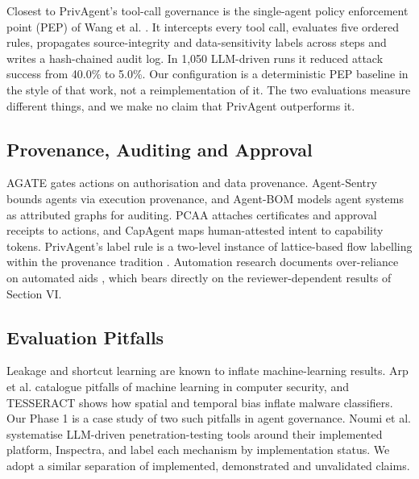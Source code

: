 \documentclass{ieeeaccess}
\begin{document}
Closest to PrivAgent's tool-call governance is the single-agent policy enforcement point (PEP) of Wang et al. \cite{wangpep}. It intercepts every tool call, evaluates five ordered rules, propagates source-integrity and data-sensitivity labels across steps and writes a hash-chained audit log. In 1,050 LLM-driven runs it reduced attack success from 40.0\% to 5.0\%. %
Our  configuration is a deterministic PEP baseline in the style of that work, not a reimplementation of it. %
The two evaluations measure different things, and we make no claim that PrivAgent outperforms it.

\subsection{Provenance, Auditing and Approval}

AGATE \cite{agate} gates actions on authorisation and data provenance. Agent-Sentry \cite{agentsentry} bounds agents via execution provenance, and Agent-BOM \cite{agentbom} models agent systems as attributed graphs for auditing. PCAA \cite{pcaa} attaches certificates and approval receipts to actions, and CapAgent \cite{capagent} maps human-attested intent to capability tokens. PrivAgent's label rule is a two-level instance of lattice-based flow labelling \cite{denning} within the provenance tradition \cite{buneman}. Automation research documents over-reliance on automated aids \cite{parasuraman}, which bears directly on the reviewer-dependent results of Section VI.

\subsection{Evaluation Pitfalls}

Leakage \cite{kapoor} and shortcut learning \cite{geirhos} are known to inflate machine-learning results. Arp et al. \cite{arp} catalogue pitfalls of machine learning in computer security, and TESSERACT \cite{tesseract} shows how spatial and temporal bias inflate malware classifiers. %
Our Phase 1 is a case study of two such pitfalls in agent governance. Noumi et al. \cite{noumi} systematise LLM-driven penetration-testing tools around their implemented platform, Inspectra, and label each mechanism by implementation status. %
We adopt a similar separation of implemented, demonstrated and unvalidated claims.
\end{document}
